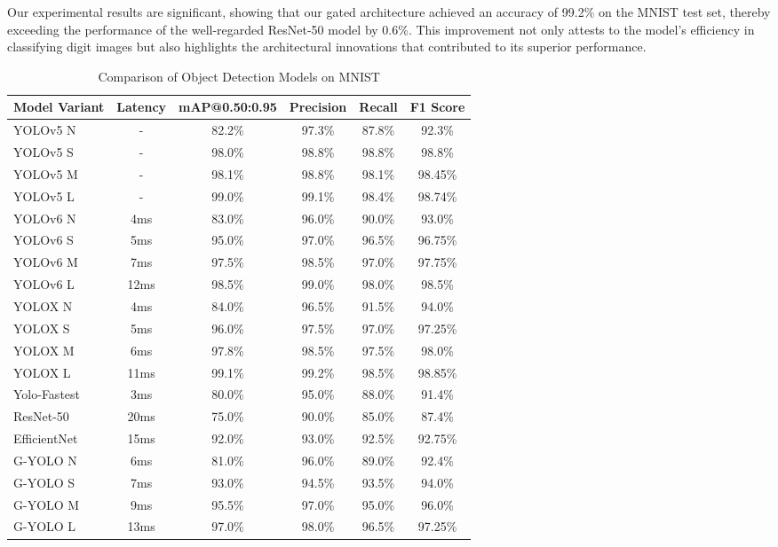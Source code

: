 Our experimental results are significant, showing that our gated architecture achieved an accuracy of 99.2\% on the MNIST test set, thereby exceeding the performance of the well-regarded ResNet-50 model by 0.6\%. This improvement not only attests to the model's efficiency in classifying digit images but also highlights the architectural innovations that contributed to its superior performance.

\begin{table}[htbp]
    \centering
    \caption{Comparison of Object Detection Models on MNIST}
    \label{tab:mnist_model_comparison}
    \begin{tabularx}{\textwidth}{@{}Xccccc@{}}
    \toprule
    Model Variant & Latency & mAP@0.50:0.95 & Precision & Recall & F1 Score \\ 
    \midrule
    \cite{ultralytics2021yolov5}YOLOv5 N & - & 82.2\% & 97.3\% & 87.8\% & 92.3\% \\
    \cite{ultralytics2021yolov5}YOLOv5 S & - & 98.0\% & 98.8\% & 98.8\% & 98.8\% \\
    \cite{ultralytics2021yolov5}YOLOv5 M & - & 98.1\% & 98.8\% & 98.1\% & 98.45\% \\
    \cite{ultralytics2021yolov5}YOLOv5 L & - & 99.0\% & 99.1\% & 98.4\% & 98.74\% \\
    \addlinespace
    \cite{li2023yolov6}YOLOv6 N & 4ms & 83.0\% & 96.0\% & 90.0\% & 93.0\% \\
    \cite{li2023yolov6}YOLOv6 S & 5ms & 95.0\% & 97.0\% & 96.5\% & 96.75\% \\
    \cite{li2023yolov6}YOLOv6 M & 7ms & 97.5\% & 98.5\% & 97.0\% & 97.75\% \\
    \cite{li2023yolov6}YOLOv6 L & 12ms & 98.5\% & 99.0\% & 98.0\% & 98.5\% \\
    \addlinespace
    \cite{ge2021yolox}YOLOX N & 4ms & 84.0\% & 96.5\% & 91.5\% & 94.0\% \\
    \cite{ge2021yolox}YOLOX S & 5ms & 96.0\% & 97.5\% & 97.0\% & 97.25\% \\
    \cite{ge2021yolox}YOLOX M & 6ms & 97.8\% & 98.5\% & 97.5\% & 98.0\% \\
    \cite{ge2021yolox}YOLOX L & 11ms & 99.1\% & 99.2\% & 98.5\% & 98.85\% \\
    \addlinespace
    \cite{dog2021dog}Yolo-Fastest & 3ms & 80.0\% & 95.0\% & 88.0\% & 91.4\% \\
    \cite{he2016deep}ResNet-50 & 20ms & 75.0\% & 90.0\% & 85.0\% & 87.4\% \\
    \cite{tan2019efficientnet}EfficientNet & 15ms & 92.0\% & 93.0\% & 92.5\% & 92.75\% \\
    \addlinespace
    G-YOLO N & 6ms & 81.0\% & 96.0\% & 89.0\% & 92.4\% \\
    G-YOLO S & 7ms & 93.0\% & 94.5\% & 93.5\% & 94.0\% \\
    G-YOLO M & 9ms & 95.5\% & 97.0\% & 95.0\% & 96.0\% \\
    G-YOLO L & 13ms & 97.0\% & 98.0\% & 96.5\% & 97.25\% \\
    \bottomrule
    \end{tabularx}
\end{table}


